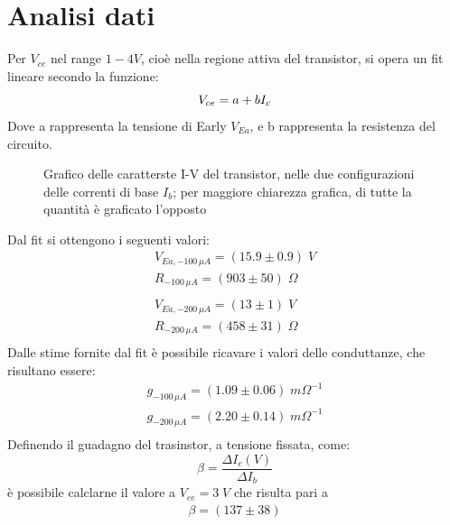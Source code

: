 \documentclass{article}
\begin{document}
\newpage
\section{Analisi dati}

Per $V_{ce}$ nel range $1-4 V$, cioè nella regione attiva del transistor, si opera un fit lineare secondo la funzione:
\begin{equation}
    V_{ce} = a + b I_c\\
\end{equation}
Dove a rappresenta la tensione di Early $V_{Ea}$, e b rappresenta la resistenza del circuito.\\
\begin{figure}[H]
    \begin{center}
        \scalebox{0.7}{}
        \caption{\centering\label{fig:multigraph}Grafico delle caratterste I-V del transistor, nelle due configurazioni delle correnti di base $I_b$; per maggiore chiarezza grafica, di tutte la quantità è graficato l'opposto}
    \end{center}
\end{figure}
Dal fit si ottengono i seguenti valori:
\begin{equation}
    \begin{aligned}
        V_{Ea,-100 \,\mu A}=(15.9\pm 0.9) \;V  \\
        R_{-100 \,\mu A}=(903 \pm 50) \;\Omega \\
        \\
        V_{Ea,-200 \,\mu A}=(13\pm 1) \;V      \\
        R_{-200 \,\mu A}=(458 \pm 31) \;\Omega \\
    \end{aligned}
\end{equation}
Dalle stime fornite dal fit è possibile ricavare i valori delle conduttanze, che risultano essere:
\begin{equation}
    \begin{aligned}
        g_{-100 \,\mu A}=(1.09 \pm 0.06) \;m\Omega^{-1} \\
        g_{-200 \,\mu A}=(2.20 \pm 0.14) \;m\Omega^{-1} \\
    \end{aligned}
\end{equation}
Definendo il guadagno del trasinstor, a tensione fissata, come:
\begin{equation}
    \beta= \frac{\Delta I_c(V)}{\Delta I_b}
\end{equation}
è possibile calclarne il valore a $V_{ce}=3 \;V$ che risulta pari a
\begin{equation}
    \begin{aligned}
        \beta=(137\pm38)
    \end{aligned}
\end{equation}
\end{document}
